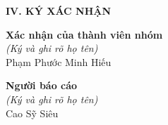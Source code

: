 \textbf{IV. KÝ XÁC NHẬN}
\vspace{0.5cm}

\noindent
\begin{minipage}{0.5\textwidth}
	\centering
	\textbf{Xác nhận của thành viên nhóm} \\
	\textit{(Ký và ghi rõ họ tên)} \\
	\vspace{2cm}
	Phạm Phước Minh Hiếu
\end{minipage}%
\begin{minipage}{0.5\textwidth}
	\centering
	\textbf{Người báo cáo} \\
	\textit{(Ký và ghi rõ họ tên)} \\
	\vspace{2cm}
	Cao Sỹ Siêu
\end{minipage}